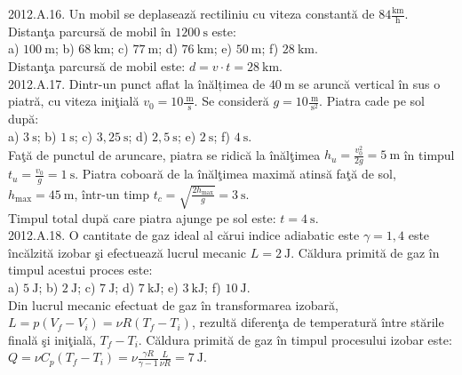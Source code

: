 2012.A.16. Un mobil se deplasează rectiliniu cu viteza constantă de $84 \frac{\mathrm{km}}{\mathrm{h}}$. Distanţa parcursă de mobil în $1200 \mathrm{~s}$ este:\\ a) $100 \mathrm{~m}$; b) $68 \mathrm{~km}$; c) $77 \mathrm{~m}$; d) $76 \mathrm{~km}$; e) $50 \mathrm{~m}$; f) $28 \mathrm{~km}$.\\ Distanţa parcursă de mobil este: $d=v \cdot t=28 \mathrm{~km}$.\\

2012.A.17. Dintr-un punct aflat la înălțimea de $40 \mathrm{~m}$ se aruncă vertical în sus o piatră, cu viteza iniţială $v_{0}=10 \frac{\mathrm{~m}}{\mathrm{~s}}$. Se consideră $g=10 \frac{\mathrm{~m}}{\mathrm{~s}^{2}}$. Piatra cade pe sol după:\\ a) $3 \mathrm{~s}$; b) $1 \mathrm{~s}$; c) $3,25 \mathrm{~s}$; d) $2,5 \mathrm{~s}$; e) $2 \mathrm{~s}$; f) $4 \mathrm{~s}$.\\ Faţă de punctul de aruncare, piatra se ridică la înălţimea $h_{u}=\frac{v_{0}^{2}}{2 g}=5 \mathrm{~m}$ în timpul $t_{u}=\frac{v_{0}}{g}=1 \mathrm{~s}$. Piatra coboară de la înălţimea maximă atinsă faţă de sol, $h_{\max}=45 \mathrm{~m}$, într-un timp $t_{c}=\sqrt{\frac{2 h_{\max}}{g}}=3 \mathrm{~s}$.\\ Timpul total după care piatra ajunge pe sol este: $t=4 \mathrm{~s}$.\\

2012.A.18. O cantitate de gaz ideal al cărui indice adiabatic este $\gamma=1,4$ este încălzită izobar şi efectuează lucrul mecanic $L=2 \mathrm{~J}$. Căldura primită de gaz în timpul acestui proces este:\\ a) $5 \mathrm{~J}$; b) $2 \mathrm{~J}$; c) $7 \mathrm{~J}$; d) $7 \mathrm{~kJ}$; e) $3 \mathrm{~kJ}$; f) $10 \mathrm{~J}$.\\ Din lucrul mecanic efectuat de gaz în transformarea izobară, $L=p\left(V_{f}-V_{i}\right)=\nu R\left(T_{f}-T_{i}\right)$, rezultă diferenţa de temperatură între stările finală şi iniţială, $T_{f}-T_{i}$. Căldura primită de gaz în timpul procesului izobar este:\\ $Q=\nu C_{p}\left(T_{f}-T_{i}\right)=\nu \frac{\gamma R}{\gamma-1} \frac{L}{\nu R}=7 \mathrm{~J}$.\\
